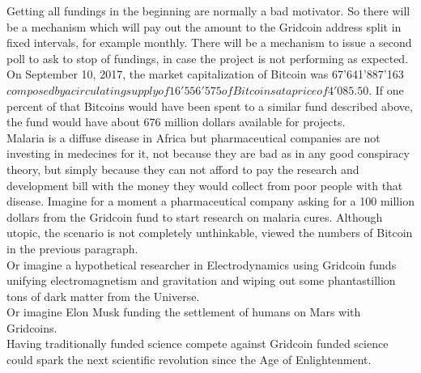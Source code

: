 Getting all fundings in the beginning are normally a bad motivator. So there will be a mechanism which will pay out the amount to the Gridcoin address split in fixed intervals, for example monthly. There will be a mechanism to issue a second poll to ask to stop of fundings, in case the project is not performing as expected.\\

On September 10, 2017, the market capitalization of Bitcoin was 67'641'887'163 $ composed by a circulating supply of 16'556'575 of Bitcoins at a price of 4'085.50 $. If one percent of that Bitcoins would have been spent to a similar fund described above, the fund would have about 676 million dollars available for projects.\\

Malaria is a diffuse disease in Africa but pharmaceutical companies are not investing in medecines for it, not because they are bad as in any good conspiracy theory, but simply because they can not afford to pay the research and development bill with the money they would collect from poor people with that disease. Imagine for a moment a pharmaceutical company asking for a 100 million dollars from the Gridcoin fund to start research on malaria cures. Although utopic, the scenario is not completely unthinkable, viewed the numbers of Bitcoin in the previous paragraph.\\

Or imagine a hypothetical researcher in Electrodynamics using Gridcoin funds unifying electromagnetism and gravitation and wiping out some phantastillion tons of dark matter from the Universe.\\

Or imagine Elon Musk funding the settlement of humans on Mars with Gridcoins.\\

Having traditionally funded science compete against Gridcoin funded science could spark the next scientific revolution since the Age of Enlightenment.\\

